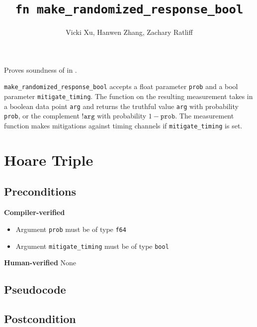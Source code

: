 \documentclass{article}
\title{\texttt{fn make\_randomized\_response\_bool}}
\author{Vicki Xu, Hanwen Zhang, Zachary Ratliff}
\begin{document}
 
 
\maketitle 

\timingMitigation
 
Proves soundness of  in . 
 
\texttt{make\_randomized\_response\_bool} accepts a float parameter \texttt{prob} and a bool parameter \texttt{mitigate\_timing}. 
The function on the resulting measurement takes in a boolean data point \texttt{arg} and returns the truthful value \texttt{arg} with probability \texttt{prob}, 
or the complement $\texttt{!arg}$ with probability $1 - \texttt{prob}$. 
The measurement function makes mitigations against timing channels if \texttt{mitigate\_timing} is set.  
 
\section{Hoare Triple} 
 
\subsection*{Preconditions} 
\textbf{Compiler-verified}
\begin{itemize} 
    \item Argument \texttt{prob} must be of type \texttt{f64} 
    \item Argument \texttt{mitigate\_timing} must be of type \texttt{bool} 
\end{itemize} 
 
\textbf{Human-verified}
None

\subsection*{Pseudocode} 
 
 
\subsection*{Postcondition} 
 
 
\end{document}
